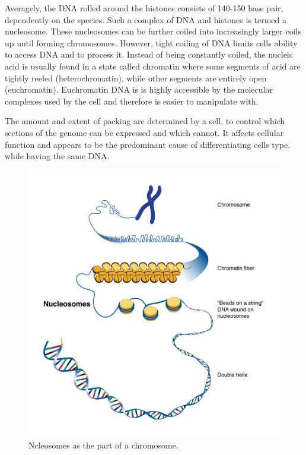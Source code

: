 Averagely, the DNA rolled around the histones consists of 140-150 base pair, dependently on the species. Such a complex of DNA and histones is termed a nucleosome. 
These nucleosomes can be further coiled into increasingly larger coils up until forming chromosomes. However, tight coiling of DNA limits cells ability to access DNA and to process it.
Instead of being constantly coiled, the nucleic acid is usually found in a state called chromatin where some segments of acid are tightly reeled (heterochromatin), 
while other segments are entirely open (euchromatin). Euchromatin DNA is is highly accessible by the molecular complexes used by the cell and therefore is easier to manipulate with. 

The amount and extent of packing are determined by a sell, to control which sections of the genome can be expressed and which cannot. 
It affects cellular function and appears to be the predominant cause of differentiating cells type, while having the same DNA.

\begin{figure}[!ht]
	\centering
	\includegraphics[width=.9\textwidth]{figures/nucleosome1}
	\caption{Ncleosomes as the part of a chromosome.\label{o:latex_friendly_zone}}
\end{figure}

